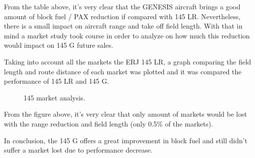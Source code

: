 From the table above, it's very clear that the GENESIS aircraft brings a good amount of block fuel / PAX reduction if compared with 145 LR. Nevertheless, there is a small impact on aircraft range and take off field length. With that in mind a market study took course in order to analyze on how much this reduction would impact on 145 G future sales.

Taking into account all the markets the ERJ 145 LR, a graph comparing the field length and route distance of each market was plotted and it was compared the performance of 145 LR and 145 G. 

\begin{figure}[H] %
\caption{145 market analysis.}
\label{fig:airportsTOFL}
\end{figure}

From the figure above, it's very clear that only amount of markets would be lost with the range reduction and field length (only 0.5\% of the markets).

In conclusion, the 145 G offers a great improvement in block fuel and still didn't suffer a market lost due to performance decrease.




